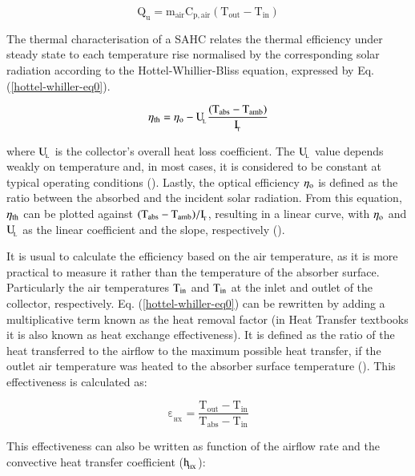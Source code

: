 \begin{equation}
	\mathrm{{Q_u} = {m_{air}}{C_{p,air}}({T_{out}} - {T_{in}})}
	\label{usefulenergy0}
\end{equation}

The thermal characterisation of a SAHC relates the thermal efficiency under steady state to each temperature rise normalised by the corresponding solar radiation according to the Hottel-Whillier-Bliss equation, expressed by Eq. (\ref{hottel-whiller-eq0}).

\begin{equation}
	\mathrm{\eta_{\rm{th}} = \eta_o - {U_{\!_L}}\frac{(T_{abs} - T_{amb})}{I_{\!_T}}}
	\label{hottel-whiller-eq0}
\end{equation}

\noindent where $\rm{U_{\!_L}}$ is the collector's overall heat loss coefficient. The $\rm{U_{\!_L}}$ value depends weakly on temperature and, in most cases, it is considered to be constant at typical operating conditions (\cite{Rabl1985}). Lastly, the optical efficiency $\eta_{\rm{o}}$ is defined as the ratio between the absorbed and the incident solar radiation. From this equation, $\eta_{\rm{th}}$ can be plotted against $\rm{(T_{abs} - T_{amb})/I_{\!_T}}$, resulting in a linear curve, with $\eta_{\rm{o}}$ and $\rm{{U_{\!_L}}}$ as the linear coefficient and the slope, respectively (\cite{Goswami2015}). 

It is usual to calculate the efficiency based on the air temperature, as it is more practical to measure it rather than the temperature of the absorber surface. Particularly the air temperatures $\rm{T_{in}}$ and $\rm{T_{in}}$ at the inlet and outlet of the collector, respectively. Eq. (\ref{hottel-whiller-eq0}) can be rewritten by adding a multiplicative term known as the heat removal factor (in Heat Transfer textbooks it is also known as heat exchange effectiveness). It is defined as the ratio of the heat transferred to the airflow to the maximum possible heat transfer, if the outlet air temperature was heated to the absorber surface temperature (\cite{Kutscher1994}). This effectiveness is calculated as:

\begin{equation}
	\mathrm{\varepsilon_{\!_{HX}} = {\frac{{{T_{out}} - {T_{in}}}}{{{T_{abs}} - {T_{in}}}}}}
	\label{heat-exchange}
\end{equation}

This effectiveness can also be written as function of the airflow rate and the convective heat transfer coefficient ($\rm{h_{\!_{HX}}}$):

